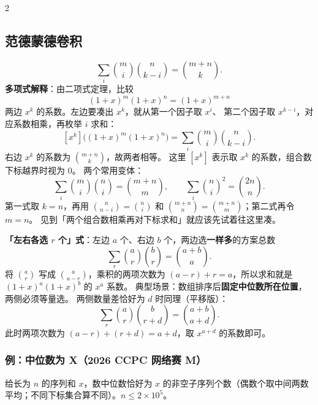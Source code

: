 \begin{multicols*}{2}
		\subsection{范德蒙德卷积}

		\[
			\sum_{i}\binom{m}{i}\binom{n}{k-i} = \binom{m+n}{k}.
		\]
		\textbf{多项式解释}：由二项式定理，比较
		\[
			(1+x)^m(1+x)^n=(1+x)^{m+n}
		\]
		两边 $x^k$ 的系数。左边要凑出 $x^k$，就从第一个因子取 $x^i$、
		第二个因子取 $x^{k-i}$，对应系数相乘，再枚举 $i$ 求和：
		\[
			[x^k]\bigl((1+x)^m(1+x)^n\bigr)
			=\sum_i\binom{m}{i}\binom{n}{k-i}.
		\]
		右边 $x^k$ 的系数为 $\binom{m+n}{k}$，故两者相等。
		这里 $[x^k]$ 表示取 $x^k$ 的系数，组合数下标越界时视为 $0$。
		两个常用变体：
		\[
			\sum_{i}\binom{m}{i}\binom{n}{i} = \binom{m+n}{m},
			\qquad
			\sum_{i}\binom{n}{i}^{2} = \binom{2n}{n}.
		\]
		第一式取 $k=n$，再用 $\binom{n}{n-i}=\binom{n}{i}$ 和
		$\binom{m+n}{n}=\binom{m+n}{m}$；第二式再令 $m=n$。
		见到「两个组合数相乘再对下标求和」就应该先试着往这里凑。

		\textbf{「左右各选 $r$ 个」式}：左边 $a$ 个、右边 $b$ 个，两边选\textbf{一样多}的方案总数
		\[
			\sum_{r}\binom{a}{r}\binom{b}{r} = \binom{a+b}{a}.
		\]
		将 $\binom{a}{r}$ 写成 $\binom{a}{a-r}$，乘积的两项次数为
		$(a-r)+r=a$，所以求和就是 $(1+x)^a(1+x)^b$ 的 $x^a$ 系数。
		典型场景：数组排序后\textbf{固定中位数所在位置}，两侧必须等量选。
		两侧数量差恰好为 $d$ 时同理（平移版）：
		\[
			\sum_{r}\binom{a}{r}\binom{b}{r+d} = \binom{a+b}{a+d}.
		\]
		此时两项次数为 $(a-r)+(r+d)=a+d$，取 $x^{a+d}$ 的系数即可。

		\subsubsection{例：中位数为 X（2026 CCPC 网络赛 M）}

		给长为 $n$ 的序列和 $x$，数中位数恰好为 $x$ 的非空子序列个数（偶数个取中间两数平均；不同下标集合算不同）。$n\le 2\times10^5$。


\end{multicols*}
